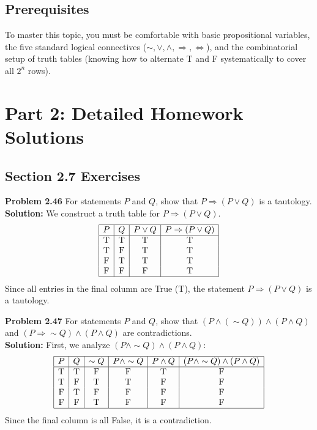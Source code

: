 \documentclass{article}
\begin{document}
\subsection*{Prerequisites}
To master this topic, you must be comfortable with basic propositional variables, the five standard logical connectives ($\sim, \lor, \land, \Rightarrow, \Leftrightarrow$), and the combinatorial setup of truth tables (knowing how to alternate T and F systematically to cover all $2^n$ rows).

\newpage
\section*{Part 2: Detailed Homework Solutions}

\subsection*{Section 2.7 Exercises}

\textbf{Problem 2.46} For statements $P$ and $Q$, show that $P \Rightarrow (P \lor Q)$ is a tautology.
\\[0.5em]
\textbf{Solution:} We construct a truth table for $P \Rightarrow (P \lor Q)$.
\[
\begin{array}{|c|c|c|c|}
\hline
P & Q & P \lor Q & P \Rightarrow (P \lor Q) \\
\hline
\text{T} & \text{T} & \text{T} & \text{T} \\
\text{T} & \text{F} & \text{T} & \text{T} \\
\text{F} & \text{T} & \text{T} & \text{T} \\
\text{F} & \text{F} & \text{F} & \text{T} \\
\hline
\end{array}
\]
Since all entries in the final column are True (T), the statement $P \Rightarrow (P \lor Q)$ is a tautology.

\vspace{1em}
\textbf{Problem 2.47} For statements $P$ and $Q$, show that $(P \land (\sim Q)) \land (P \land Q)$ and $(P \Rightarrow \sim Q) \land (P \land Q)$ are contradictions.
\\[0.5em]
\textbf{Solution:}
First, we analyze $(P \land \sim Q) \land (P \land Q)$:
\[
\begin{array}{|c|c|c|c|c|c|}
\hline
P & Q & \sim Q & P \land \sim Q & P \land Q & (P \land \sim Q) \land (P \land Q) \\
\hline
\text{T} & \text{T} & \text{F} & \text{F} & \text{T} & \text{F} \\
\text{T} & \text{F} & \text{T} & \text{T} & \text{F} & \text{F} \\
\text{F} & \text{T} & \text{F} & \text{F} & \text{F} & \text{F} \\
\text{F} & \text{F} & \text{T} & \text{F} & \text{F} & \text{F} \\
\hline
\end{array}
\]
Since the final column is all False, it is a contradiction.
\end{document}

